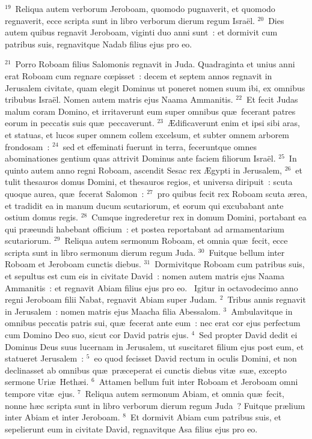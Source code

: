 ${}^{19}$~Reliqua autem verborum Jeroboam, quomodo pugnaverit, et quomodo regnaverit, ecce scripta sunt in libro verborum dierum regum Isra\"el.
${}^{20}$~Dies autem quibus regnavit Jeroboam, viginti duo anni sunt~: et dormivit cum patribus suis, regnavitque Nadab filius ejus pro eo.


${}^{21}$~Porro Roboam filius Salomonis regnavit in Juda. Quadraginta et unius anni erat Roboam cum regnare cœpisset~: decem et septem annos regnavit in Jerusalem civitate, quam elegit Dominus ut poneret nomen suum ibi, ex omnibus tribubus Isra\"el. Nomen autem matris ejus Naama Ammanitis.
${}^{22}$~Et fecit Judas malum coram Domino, et irritaverunt eum super omnibus qu\ae\ fecerant patres eorum in peccatis suis qu\ae\ peccaverunt.
${}^{23}$~\AE dificaverunt enim et ipsi sibi aras, et statuas, et lucos super omnem collem excelsum, et subter omnem arborem frondosam~:
${}^{24}$~sed et effeminati fuerunt in terra, feceruntque omnes abominationes gentium quas attrivit Dominus ante faciem filiorum Isra\"el.
${}^{25}$~In quinto autem anno regni Roboam, ascendit Sesac rex \AE gypti in Jerusalem,
${}^{26}$~et tulit thesauros domus Domini, et thesauros regios, et universa diripuit~: scuta quoque aurea, qu\ae\ fecerat Salomon~:
${}^{27}$~pro quibus fecit rex Roboam scuta \ae rea, et tradidit ea in manum ducum scutariorum, et eorum qui excubabant ante ostium domus regis.
${}^{28}$~Cumque ingrederetur rex in domum Domini, portabant ea qui pr\ae eundi habebant officium~: et postea reportabant ad armamentarium scutariorum.
${}^{29}$~Reliqua autem sermonum Roboam, et omnia qu\ae\ fecit, ecce scripta sunt in libro sermonum dierum regum Juda.
${}^{30}$~Fuitque bellum inter Roboam et Jeroboam cunctis diebus.
${}^{31}$~Dormivitque Roboam cum patribus suis, et sepultus est cum eis in civitate David~: nomen autem matris ejus Naama Ammanitis~: et regnavit Abiam filius ejus pro eo.
~\lettrine[lines=10,image=true,loversize=0.05,lraise=-0.03]{I}{}gitur in octavodecimo anno regni Jeroboam filii Nabat, regnavit Abiam super Judam.
${}^{2}$~Tribus annis regnavit in Jerusalem~: nomen matris ejus Maacha filia Abessalom.
${}^{3}$~Ambulavitque in omnibus peccatis patris sui, qu\ae\ fecerat ante eum~: nec erat cor ejus perfectum cum Domino Deo suo, sicut cor David patris ejus.
${}^{4}$~Sed propter David dedit ei Dominus Deus suus lucernam in Jerusalem, ut suscitaret filium ejus post eum, et statueret Jerusalem~:
${}^{5}$~eo quod fecisset David rectum in oculis Domini, et non declinasset ab omnibus qu\ae\ pr\ae ceperat ei cunctis diebus vit\ae\ su\ae , excepto sermone Uri\ae\ Heth\ae i.
${}^{6}$~Attamen bellum fuit inter Roboam et Jeroboam omni tempore vit\ae\ ejus.
${}^{7}$~Reliqua autem sermonum Abiam, et omnia qu\ae\ fecit, nonne h\ae c scripta sunt in libro verborum dierum regum Juda~? Fuitque pr\ae lium inter Abiam et inter Jeroboam.
${}^{8}$~Et dormivit Abiam cum patribus suis, et sepelierunt eum in civitate David, regnavitque Asa filius ejus pro eo.


